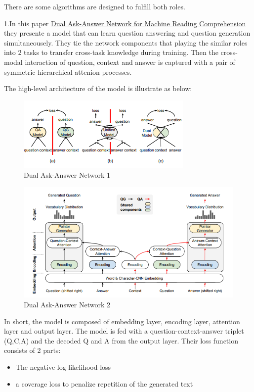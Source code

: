 \documentclass{acm_proc_article-sp}
\begin{document}
There are some algorithms are designed to fulfill both roles.

1.In this paper \href{https://arxiv.org/pdf/1809.01997.pdf}{Dual
Ask-Answer Network for Machine Reading Comprehension} they presente a
model that can learn question answering and question generation
simultaneousely. They tie the network components that playing the
similar roles into 2 tasks to transfer cross-task knowledge during
training. Then the cross-modal interaction of question, context and
answer is captured with a pair of symmetric hierarchical attenion
processes.

The high-level architecture of the model is illustrate as below:

\begin{figure}
\centering
\includegraphics{img/qgqa.png}
\caption{Dual Ask-Answer Network 1}
\end{figure}

\begin{figure}
\centering
\includegraphics{img/daan.png}
\caption{Dual Ask-Answer Network 2}
\end{figure}

In short, the model is composed of embedding layer, encoding layer,
attention layer and output layer. The model is fed with a
question-context-answer triplet (Q,C,A) and the decoded Q and A from the
output layer. Their loss function consists of 2 parts:

\begin{itemize}
\item
  The negative log-likelihood loss
\item
  a coverage loss to penalize repetition of the generated text
\end{itemize}
\end{document}
